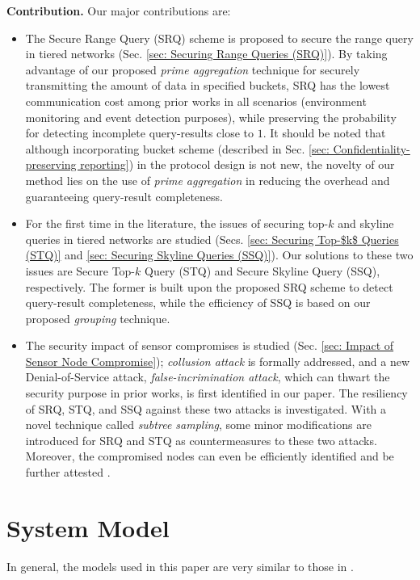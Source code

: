 \documentclass[conference]{IEEEtran}
\begin{document}
\textbf{Contribution.} Our major contributions are:
\begin{itemize}
\item The Secure Range Query (SRQ) scheme is proposed to secure the range query in tiered networks (Sec. \ref{sec: Securing Range Queries (SRQ)}). By taking advantage of our proposed \emph{prime aggregation} technique for securely transmitting the amount of data in specified buckets, SRQ has the lowest communication cost among prior works in all scenarios (environment monitoring and event detection purposes), while preserving the probability for detecting incomplete query-results close to $1$. It should be noted that although incorporating bucket scheme \cite{hilm02,hmt04} (described in Sec. \ref{sec: Confidentiality-preserving reporting}) in the protocol design \cite{sl08,szz09,zsz09} is not new, the novelty of our method lies on the use of \emph{prime aggregation} in reducing the overhead and guaranteeing query-result completeness.

\item For the first time in the literature, the issues of securing top-$k$ and skyline queries in tiered networks are studied (Secs. \ref{sec: Securing Top-$k$ Queries (STQ)} and \ref{sec: Securing Skyline Queries (SSQ)}). Our solutions to these two issues are Secure Top-$k$ Query (STQ) and Secure Skyline Query (SSQ), respectively. The former is built upon the proposed SRQ scheme to detect query-result completeness, while the efficiency of SSQ is based on our proposed \emph{grouping} technique.

\item The security impact of sensor compromises is studied (Sec. \ref{sec: Impact of Sensor Node Compromise}); \emph{collusion attack} is formally addressed, and a new Denial-of-Service attack, \emph{false-incrimination attack}, which can thwart the security purpose in prior works, is first identified in our paper. The resiliency of SRQ, STQ, and SSQ against these two attacks is investigated. With a novel technique called \emph{subtree sampling}, some minor modifications are introduced for SRQ and STQ as countermeasures to these two attacks. Moreover, the compromised nodes can even be efficiently identified and be further attested \cite{slpdk06,smkk05,spdk04}.
\end{itemize}
\section{System Model}\label{sec: System Model}
In general, the models used in this paper are very similar to those in \cite{rksegyy03,dglls05,sl08,szz09,zsz09}.
\end{document}
